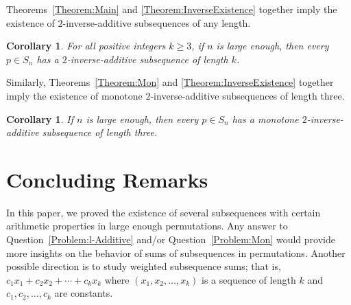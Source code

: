 \documentclass[11pt]{article}
\newtheorem{corollary}[theorem]{Corollary}
\theoremstyle{definition}
\begin{document}
Theorems~\ref{Theorem:Main} and \ref{Theorem:InverseExistence} together imply the existence of $2$-inverse-additive subsequences of any length.
\begin{corollary}
    For all positive integers $k\geq3$, if $n$ is large enough, then every $p\in S_n$ has a $2$-inverse-additive subsequence of length $k$.
\end{corollary}
Similarly, Theorems~\ref{Theorem:Mon} and \ref{Theorem:InverseExistence} together imply the existence of monotone $2$-inverse-additive subsequences of length three.
\begin{corollary}
    If $n$ is large enough, then every $p\in S_n$ has a monotone $2$-inverse-additive subsequence of length three.
\end{corollary}
\section{Concluding Remarks}\label{Section:Conclu}
In this paper, we proved the existence of several subsequences with certain arithmetic properties in large enough permutations. Any answer to Question~\ref{Problem:l-Additive} and/or Question~\ref{Problem:Mon} would provide more insights on the behavior of sums of subsequences in permutations. Another possible direction is to study weighted subsequence sums; that is, $c_1x_1+c_2x_2+\cdots+c_kx_k$ where $(x_1,x_2,\ldots,x_k)$ is a sequence of length $k$ and $c_1,c_2,\ldots,c_k$ are constants.
\end{document}

